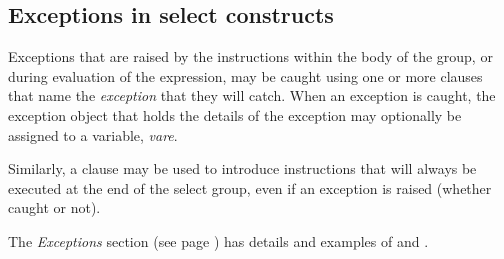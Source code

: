 \subsection{Exceptions in select constructs}
 
Exceptions that are raised by the instructions within the body of the
group, or during evaluation of the  expression, may be
caught using one or more  clauses that name
the \emph{exception} that they will catch.
When an exception is caught, the exception object that holds the details
of the exception may optionally be assigned to a variable,
\emph{vare}.
 
Similarly, a  clause may be used to introduce
instructions that will always be executed at the end of the select
group, even if an exception is raised (whether caught or not).
 
The  \emph{Exceptions} section (see page \pageref{refexcep})  has details and
examples of  and .
\index{,}
